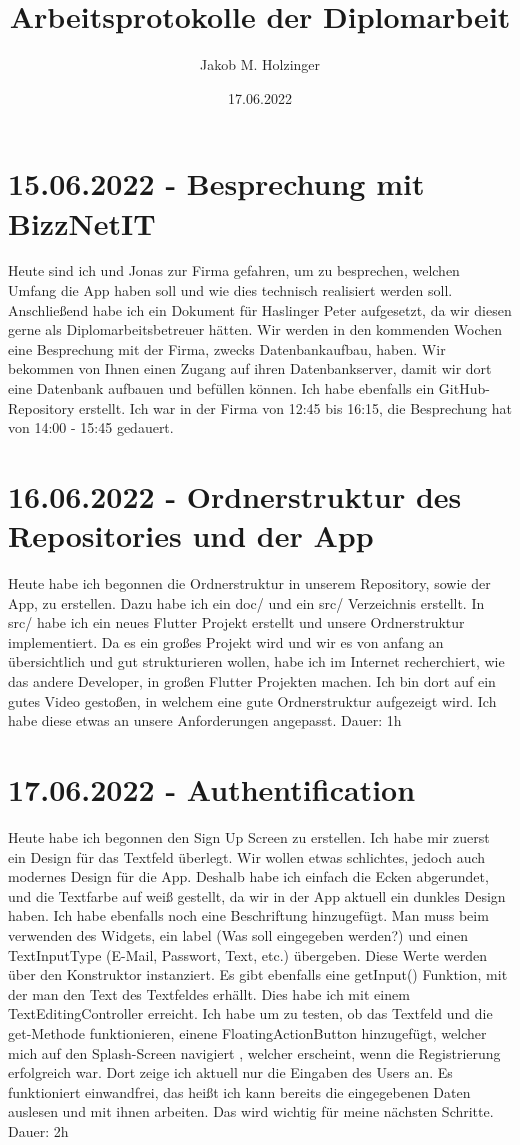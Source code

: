 \documentclass[letterpaper,10pt]{article}
\title{Arbeitsprotokolle der Diplomarbeit}
\date{17.06.2022}
\author{Jakob M. Holzinger}
\begin{document}
\maketitle
\frenchspacing
\raggedbottom
\pagestyle{plain}
\section{15.06.2022 - Besprechung mit BizzNetIT}
Heute sind ich und Jonas zur Firma gefahren, um zu besprechen, welchen Umfang die App haben soll und wie dies technisch realisiert werden soll. Anschließend habe ich ein Dokument für Haslinger Peter aufgesetzt, da wir diesen gerne als Diplomarbeitsbetreuer hätten. Wir werden in den kommenden Wochen eine Besprechung mit der Firma, zwecks Datenbankaufbau, haben. Wir bekommen von Ihnen einen Zugang auf ihren Datenbankserver, damit wir dort eine Datenbank aufbauen und befüllen können. Ich habe ebenfalls ein GitHub-Repository erstellt. Ich war in der Firma von 12:45 bis 16:15, die Besprechung hat von 14:00 - 15:45 gedauert.
\section{16.06.2022 - Ordnerstruktur des Repositories und der App}
Heute habe ich begonnen die Ordnerstruktur in unserem Repository, sowie der App, zu erstellen. Dazu habe ich ein doc/ und ein src/ Verzeichnis erstellt. In src/ habe ich ein neues Flutter Projekt erstellt und unsere Ordnerstruktur implementiert. Da es ein großes Projekt wird und wir es von anfang an übersichtlich und gut strukturieren wollen, habe ich im Internet recherchiert, wie das andere Developer, in großen Flutter Projekten machen. Ich bin dort auf ein gutes Video \cite{file-structure} gestoßen, in welchem eine gute Ordnerstruktur aufgezeigt wird. Ich habe diese etwas an unsere Anforderungen angepasst. Dauer: 1h
\section{17.06.2022 - Authentification}
Heute habe ich begonnen den Sign Up Screen zu erstellen. Ich habe mir zuerst ein Design für das Textfeld überlegt. Wir wollen etwas schlichtes, jedoch auch modernes Design für die App. Deshalb habe ich einfach die Ecken abgerundet, und die Textfarbe auf weiß gestellt, da wir in der App aktuell ein dunkles Design haben. Ich habe ebenfalls noch eine Beschriftung hinzugefügt. Man muss beim verwenden des Widgets, ein label (Was soll eingegeben werden?) und einen TextInputType (E-Mail, Passwort, Text, etc.) übergeben. Diese Werte werden über den Konstruktor instanziert. Es gibt ebenfalls eine getInput() Funktion, mit der man den Text des Textfeldes erhällt. Dies habe ich mit einem TextEditingController \cite{text-editing-controller} erreicht. Ich habe um zu testen, ob das Textfeld und die get-Methode funktionieren, einene FloatingActionButton hinzugefügt, welcher mich auf den Splash-Screen navigiert \cite{navigation}, welcher erscheint, wenn die Registrierung erfolgreich war. Dort zeige ich aktuell nur die Eingaben des Users an. Es funktioniert einwandfrei, das heißt ich kann bereits die eingegebenen Daten auslesen und mit ihnen arbeiten. Das wird wichtig für meine nächsten Schritte. Dauer: 2h
\end{document}
